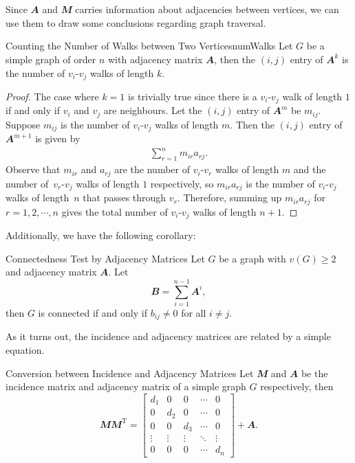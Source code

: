 \documentclass[math]{amznotes}
\theoremstyle{remark}
\newcommand{\0}{\mathbf{0}}
\newcommand{\1}{\mathbf{1}}
\begin{document}
\\\\
Since $\mathbfit{A}$ and $\mathbfit{M}$ carries information about adjacencies between vertices, we can use them to draw some conclusions regarding graph traversal.
\begin{probox}{Counting the Number of Walks between Two Vertices}{numWalks}
    Let $G$ be a simple graph of order $n$ with adjacency matrix $\mathbfit{A}$, then the $(i, j)$ entry of $\mathbfit{A}^k$ is the number of $v_i$-$v_j$ walks of length $k$.
    \tcblower   
    \begin{proof}
        The case where $k = 1$ is trivially true since there is a $v_i$-$v_j$ walk of length $1$ if and only if $v_i$ and $v_j$ are neighbours. Let the $(i, j)$ entry of $\mathbfit{A}^m$ be $m_{ij}$. Suppose $m_{ij}$ is the number of $v_i$-$v_j$ walks of length $m$. Then the $(i, j)$ entry of $\mathbfit{A}^{m + 1}$ is given by
        \begin{align*}
            \sum_{r = 1}^{n}m_{ir}a_{rj}.
        \end{align*}
        Observe that $m_{ir}$ and $a_{rj}$ are the number of $v_i$-$v_r$ walks of length $m$ and the number of~$v_r$-$v_j$ walks of length $1$ respectively, so $m_{ir}a_{rj}$ is the number of $v_i$-$v_j$ walks of length~$n$ that passes through $v_r$. Therefore, summing up $m_{ir}a_{rj}$ for $r = 1, 2, \cdots, n$ gives the total number of $v_i$-$v_j$ walks of length $n + 1$.
    \end{proof}
\end{probox}
Additionally, we have the following corollary:
\begin{corbox}{Connectedness Test by Adjacency Matrices}{}
    Let $G$ be a graph with $v(G) \geq 2$ and adjacency matrix $\mathbfit{A}$. Let
    \begin{equation*}
        \mathbfit{B} = \sum_{i = 1}^{n - 1}\mathbfit{A}^i,
    \end{equation*}
    then $G$ is connected if and only if $b_{ij} \neq 0$ for all $i \neq j$.
\end{corbox}
As it turns out, the incidence and adjacency matrices are related by a simple equation.
\begin{probox}{Conversion between Incidence and Adjacency Matrices}{}
    Let $\mathbfit{M}$ and $\mathbfit{A}$ be the incidence matrix and adjacency matrix of a simple graph $G$ respectively, then
    \begin{equation*}
        \mathbfit{M}\mathbfit{M}^{\mathrm{T}} = \begin{bmatrix}
            d_1 & 0 & 0 & \cdots & 0 \\
            0 & d_2 & 0 & \cdots & 0 \\
            0 & 0 & d_3 & \cdots & 0 \\
            \vdots & \vdots & \vdots & \ddots & \vdots \\
            0 & 0 & 0 & \cdots & d_n
        \end{bmatrix} + \mathbfit{A}.
    \end{equation*}
\end{probox}
\end{document}
